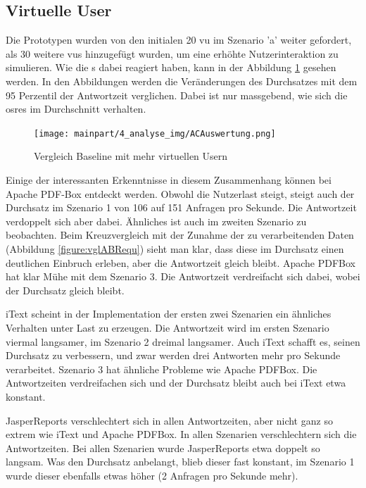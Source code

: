 \documentclass[main.tex]{subfiles}
\begin{document}
\subsection{Virtuelle User}
Die Prototypen wurden von den initialen 20 \acrshort{vu} im Szenario 'a' weiter gefordert, als 30 weitere \acrshort{vu}s hinzugefügt wurden, um eine erhöhte Nutzerinteraktion zu simulieren. Wie die s dabei reagiert haben, kann in der Abbildung \ref{figure:vglACVU} gesehen werden. In den Abbildungen werden die Veränderungen des Durchsatzes mit dem 95 Perzentil der Antwortzeit verglichen. Dabei ist nur massgebend, wie sich die \acrshort{osre}s im Durchschnitt verhalten.

\begin{figure}[!ht]
\texttt{[image: mainpart/4\_analyse\_img/ACAuswertung.png]}
 \caption{Vergleich Baseline mit mehr virtuellen Usern}
 \label{figure:vglACVU}
\end{figure}

Einige der interessanten Erkenntnisse in diesem Zusammenhang können bei Apache PDF-Box entdeckt werden. Obwohl die Nutzerlast steigt, steigt auch der Durchsatz im Szenario 1 von 106 auf 151 Anfragen pro Sekunde. Die Antwortzeit verdoppelt sich aber dabei. Ähnliches ist auch im zweiten Szenario zu beobachten. Beim Kreuzvergleich mit der Zunahme der zu verarbeitenden Daten (Abbildung \ref{figure:vglABRequ}) sieht man klar, dass diese im Durchsatz einen deutlichen Einbruch erleben, aber die Antwortzeit gleich bleibt. Apache PDFBox hat klar Mühe mit dem Szenario 3. Die Antwortzeit verdreifacht sich dabei, wobei der Durchsatz gleich bleibt.

iText scheint in der Implementation der ersten zwei Szenarien ein ähnliches Verhalten unter Last zu erzeugen. Die Antwortzeit wird im ersten Szenario viermal langsamer, im Szenario 2 dreimal langsamer. Auch iText schafft es, seinen Durchsatz zu verbessern, und zwar werden drei Antworten mehr pro Sekunde verarbeitet. Szenario 3 hat ähnliche Probleme wie Apache PDFBox. Die Antwortzeiten verdreifachen sich und der Durchsatz bleibt auch bei iText etwa konstant.

JasperReports verschlechtert sich in allen Antwortzeiten, aber nicht ganz so extrem wie iText und Apache PDFBox. In allen Szenarien verschlechtern sich die Antwortzeiten. Bei allen Szenarien wurde JasperReports etwa doppelt so langsam. Was den Durchsatz anbelangt, blieb dieser fast konstant, im Szenario 1 wurde dieser ebenfalls etwas höher (2 Anfragen pro Sekunde mehr).
\end{document}
